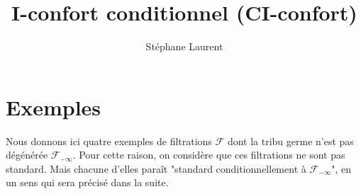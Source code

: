 \documentclass[12pt,a4paper]{article}
\author{Stéphane Laurent}
\title{I-confort conditionnel (CI-confort)}
\begin{document}
\theoremstyle{defstyle}
\newtheorem{definition}{Definition}
\newtheorem{remark}{Remark}
\newtheorem{question}{Question}
\newtheorem{clarify}{To clarify}
\newtheorem{remarque}{Remarque}
\newtheorem{exemple}{Exemple}

\theoremstyle{thmstyle}
\newtheorem{thm}{Theorem}[section]
\newtheorem{ppsition}{Proposition}
\newtheorem{lemma}{Lemma}
\newtheorem{lemme}{Lemme}

\newcommand{\BB}{\mathcal{B}}
\newcommand{\CC}{\mathcal{C}}
\newcommand{\EEE}{\mathcal{E}}
\newcommand{\FF}{\mathcal{F}}
\newcommand{\GG}{\mathcal{G}}
\newcommand{\EE}{\mathbb{E}}
\newcommand{\HH}{\mathcal{H}}
\newcommand{\II}{\mathcal{I}}
\newcommand{\LL}{\mathcal{L}}
\newcommand{\OO}{\mathcal{O}}
\newcommand{\XX}{\mathcal{X}}
\newcommand{\given}{\mid}
\newcommand{\eps}{\epsilon}
\newcommand{\indic}{\boldsymbol 1}
\newcommand{\Vb}{\boldsymbol V}
\newcommand{\tildV}{\widetilde{V}}

\newcommand{\indvee}{\dot{\vee}}
\newcommand{\indep}{\mathrel{\text{\scalebox{1.07}{$\perp\mkern-10mu\perp$}}}}


\maketitle

\section{Exemples}

Nous donnons ici quatre exemples de filtrations $\FF$ dont la tribu germe 
n'est pas dégénérée $\FF_{-\infty}$. 
Pour cette raison, on considère que ces filtrations ne sont pas standard. 
Mais chacune d'elles para\^it "standard conditionnellement à $\FF_{-\infty}$", 
en un sens qui sera précisé dans la suite. 
\end{document}
